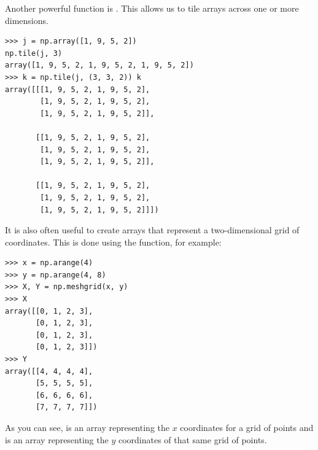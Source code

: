 Another powerful function is
. This allows us to tile arrays across one or more
dimensions. 
\begin{lstlisting}
>>> j = np.array([1, 9, 5, 2]) 
np.tile(j, 3)
array([1, 9, 5, 2, 1, 9, 5, 2, 1, 9, 5, 2])
>>> k = np.tile(j, (3, 3, 2)) k
array([[[1, 9, 5, 2, 1, 9, 5, 2],
        [1, 9, 5, 2, 1, 9, 5, 2],
        [1, 9, 5, 2, 1, 9, 5, 2]],

       [[1, 9, 5, 2, 1, 9, 5, 2],
        [1, 9, 5, 2, 1, 9, 5, 2],
        [1, 9, 5, 2, 1, 9, 5, 2]],

       [[1, 9, 5, 2, 1, 9, 5, 2],
        [1, 9, 5, 2, 1, 9, 5, 2],
        [1, 9, 5, 2, 1, 9, 5, 2]]])

\end{lstlisting}


It is also often useful to create arrays that represent a
two-dimensional grid of coordinates. This is done using the
 function, for example:
\begin{lstlisting}
>>> x = np.arange(4) 
>>> y = np.arange(4, 8) 
>>> X, Y = np.meshgrid(x, y) 
>>> X
array([[0, 1, 2, 3],
       [0, 1, 2, 3],
       [0, 1, 2, 3],
       [0, 1, 2, 3]])
>>> Y
array([[4, 4, 4, 4],
       [5, 5, 5, 5],
       [6, 6, 6, 6],
       [7, 7, 7, 7]])
\end{lstlisting} 
As you can see,  is an array representing the $x$
coordinates for a grid of points and  is an array representing the
$y$ coordinates of that same grid of points. 

